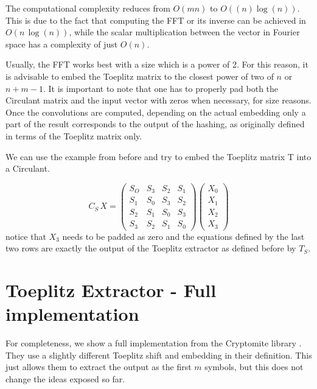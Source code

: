 The computational complexity reduces from \( O(mn) \) to \( O((n) \log (n)) \). This is due to the fact that computing the FFT or its inverse can be achieved in $O(n\,\log(n))$, while the scalar multiplication between the vector in Fourier space has a complexity of just $O(n)$.

Usually, the FFT works best with a size which is a power of 2. For this reason, it is advisable to embed the Toeplitz matrix to the closest power of two of $n$ or $n+m-1$. It is important to note that one has to properly pad both the Circulant matrix and the input vector with zeros when necessary, for size reasons. Once the convolutions are computed, depending on the actual embedding only a part of the result corresponds to the output of the hashing, as originally defined in terms of the Toeplitz matrix only.


\begin{example}
We can use the example from before and try to embed the Toeplitz matrix T into a Circulant.

\begin{equation}
C_S\,X = \begin{pmatrix}
S_O & S_3 & S_2 & S_1 	 \\
S_1 & S_0 & S_3 & S_2 	 \\
S_2 & S_1 & S_0 & S_3 	 \\
S_3 & S_2 & S_1 & S_0
\end{pmatrix}
\begin{pmatrix}
	X_0 \\
	X_1 \\
	X_2 \\
	X_3
\end{pmatrix}
\end{equation}
notice that $X_3$ needs to be padded as zero and the equations defined by the last two rows are exactly the output of the Toeplitz extractor as defined before by $T_S$. 
\end{example}

\section{Toeplitz Extractor - Full implementation}

For completeness, we show a full implementation from the Cryptomite library \cite{Cryptomite}. They use a slightly different Toeplitz shift and embedding in their definition. This just allows them to extract the output as the first $m$ symbols, but this does not change the ideas exposed so far. 


